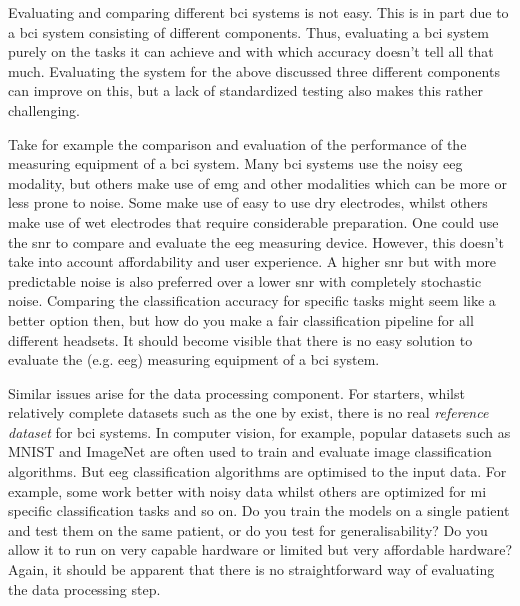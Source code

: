 

Evaluating and comparing different \gls{bci} systems is not easy.
This is in part due to a \gls{bci} system consisting of different components.
Thus, evaluating a \gls{bci} system purely on the tasks it can achieve and with which accuracy doesn't tell all that much.
Evaluating the system for the above discussed three different components can improve on this, but a lack of standardized testing also makes this rather challenging.

Take for example the comparison and evaluation of the performance of the measuring equipment of a \gls{bci} system.
Many \gls{bci} systems use the noisy \gls{eeg} modality, but others make use of \gls{emg} and other modalities which can be more or less prone to noise. 
Some make use of easy to use dry electrodes, whilst others make use of wet electrodes that require considerable preparation.
One could use the \gls{snr} to compare and evaluate the \gls{eeg} measuring device.
However, this doesn't take into account affordability and user experience.
A higher \gls{snr} but with more predictable noise is also preferred over a lower \gls{snr} with completely stochastic noise.
Comparing the classification accuracy for specific tasks might seem like a better option then, but how do you make a fair classification pipeline for all different headsets.
It should become visible that there is no easy solution to evaluate the (e.g. \gls{eeg}) measuring equipment of a \gls{bci} system.

Similar issues arise for the data processing component.
For starters, whilst relatively complete datasets such as the one by \citet{eeg_data} exist, there is no real \textit{reference dataset} for \gls{bci} systems.
In computer vision, for example, popular datasets such as MNIST \citep{mnist} and ImageNet \citep{imagenet} are often used to train and evaluate image classification algorithms.
But \gls{eeg} classification algorithms are optimised to the input data.
For example, some work better with noisy data whilst others are optimized for \gls{mi} specific classification tasks and so on.
Do you train the models on a single patient and test them on the same patient, or do you test for generalisability?
Do you allow it to run on very capable hardware or limited but very affordable hardware?
Again, it should be apparent that there is no straightforward way of evaluating the data processing step. 

